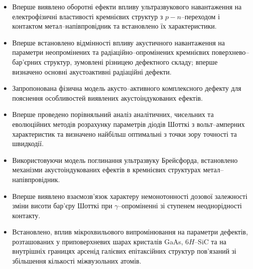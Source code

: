 \begin{itemize}[leftmargin=0em,itemindent=1.5em]
\renewcommand{\labelitemi}{$\bullet$}
  \item Вперше виявлено оборотні ефекти впливу ультразвукового навантаження на електрофізичні
   властивості кремнієвих структур з $p-n$--переходом і контактом метал--напівпровідник
   та встановлено їх характеристики.

  \item Вперше встановлено відмінності впливу акустичного навантаження на параметри неопромінених та радіаційно--опромінених кремнієвих поверхнево--бар'єрних структур,
  зумовлені різницею дефектного складу;
      вперше визначено основні акустоактивні радіаційні дефекти.

  \item Запропонована фізична модель акусто--активного комплексного дефекту для пояснення особливостей виявлених акустоіндукованих ефектів.

  \item Вперше проведено порівняльний аналіз аналітичних, чисельних та еволюційних методів розрахунку параметрів діодів Шотткі з вольт--амперних характеристик та визначено найбільш оптимальні з точки зору точності та швидкодії.

  \item Використовуючи модель поглинання ультразвуку Брейсфорда, встановлено механізми акустоіндукованих ефектів в кремнієвих структурах метал--напівпровідник.


  \item Вперше виявлено  взаємозв'язок характеру немонотонності дозової залежності зміни висоти бар'єру Шотткі при $\gamma$--опроміненні зі ступенем неоднорідності контакту.

  \item Встановлено, вплив мікрохвильового випромінювання на параметри дефектів, розташованих у приповерхневих шарах кристалів GaAs, 6$H$--SiC та на внутрішніх границях арсенід галієвих епітаксійних структур пов'язаний зі збільшення кількості міжвузольних атомів.

\end{itemize}



